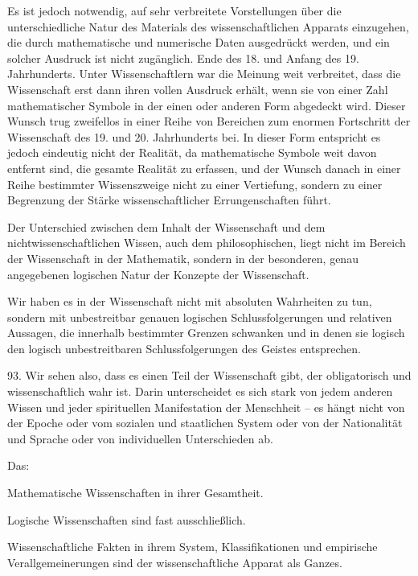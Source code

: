 \documentclass[11pt,a4paper]{book}
\begin{document}
Es ist jedoch notwendig, auf sehr verbreitete Vorstellungen über die unterschiedliche Natur des Materials des wissenschaftlichen Apparats einzugehen, die durch mathematische und numerische Daten ausgedrückt werden, und ein solcher Ausdruck ist nicht zugänglich. Ende des 18. und Anfang des 19. Jahrhunderts. Unter Wissenschaftlern war die Meinung weit verbreitet, dass die Wissenschaft erst dann ihren vollen Ausdruck erhält, wenn sie von einer Zahl mathematischer Symbole in der einen oder anderen Form abgedeckt wird. Dieser Wunsch trug zweifellos in einer Reihe von Bereichen zum enormen Fortschritt der Wissenschaft des 19. und 20. Jahrhunderts bei. In dieser Form entspricht es jedoch eindeutig nicht der Realität, da mathematische Symbole weit davon entfernt sind, die gesamte Realität zu erfassen, und der Wunsch danach in einer Reihe bestimmter Wissenszweige nicht zu einer Vertiefung, sondern zu einer Begrenzung der Stärke wissenschaftlicher Errungenschaften führt.



Der Unterschied zwischen dem Inhalt der Wissenschaft und dem nichtwissenschaftlichen Wissen, auch dem philosophischen, liegt nicht im Bereich der Wissenschaft in der Mathematik, sondern in der besonderen, genau angegebenen logischen Natur der Konzepte der Wissenschaft.



Wir haben es in der Wissenschaft nicht mit absoluten Wahrheiten zu tun, sondern mit unbestreitbar genauen logischen Schlussfolgerungen und relativen Aussagen, die innerhalb bestimmter Grenzen schwanken und in denen sie logisch den logisch unbestreitbaren Schlussfolgerungen des Geistes entsprechen.



93. Wir sehen also, dass es einen Teil der Wissenschaft gibt, der obligatorisch und wissenschaftlich wahr ist. Darin unterscheidet es sich stark von jedem anderen Wissen und jeder spirituellen Manifestation der Menschheit -- es hängt nicht von der Epoche oder vom sozialen und staatlichen System oder von der Nationalität und Sprache oder von individuellen Unterschieden ab.



Das:



    Mathematische Wissenschaften in ihrer Gesamtheit.

    Logische Wissenschaften sind fast ausschließlich.

    Wissenschaftliche Fakten in ihrem System, Klassifikationen und empirische Verallgemeinerungen sind der wissenschaftliche Apparat als Ganzes.
\end{document}
